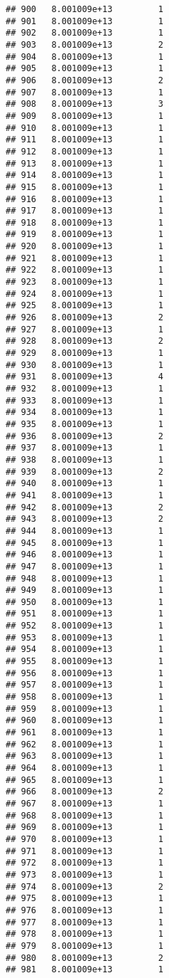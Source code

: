 \documentclass[
]{article}
\begin{document}
\begin{verbatim}
## 900   8.001009e+13         1
## 901   8.001009e+13         1
## 902   8.001009e+13         1
## 903   8.001009e+13         2
## 904   8.001009e+13         1
## 905   8.001009e+13         1
## 906   8.001009e+13         2
## 907   8.001009e+13         1
## 908   8.001009e+13         3
## 909   8.001009e+13         1
## 910   8.001009e+13         1
## 911   8.001009e+13         1
## 912   8.001009e+13         1
## 913   8.001009e+13         1
## 914   8.001009e+13         1
## 915   8.001009e+13         1
## 916   8.001009e+13         1
## 917   8.001009e+13         1
## 918   8.001009e+13         1
## 919   8.001009e+13         1
## 920   8.001009e+13         1
## 921   8.001009e+13         1
## 922   8.001009e+13         1
## 923   8.001009e+13         1
## 924   8.001009e+13         1
## 925   8.001009e+13         1
## 926   8.001009e+13         2
## 927   8.001009e+13         1
## 928   8.001009e+13         2
## 929   8.001009e+13         1
## 930   8.001009e+13         1
## 931   8.001009e+13         4
## 932   8.001009e+13         1
## 933   8.001009e+13         1
## 934   8.001009e+13         1
## 935   8.001009e+13         1
## 936   8.001009e+13         2
## 937   8.001009e+13         1
## 938   8.001009e+13         1
## 939   8.001009e+13         2
## 940   8.001009e+13         1
## 941   8.001009e+13         1
## 942   8.001009e+13         2
## 943   8.001009e+13         2
## 944   8.001009e+13         1
## 945   8.001009e+13         1
## 946   8.001009e+13         1
## 947   8.001009e+13         1
## 948   8.001009e+13         1
## 949   8.001009e+13         1
## 950   8.001009e+13         1
## 951   8.001009e+13         1
## 952   8.001009e+13         1
## 953   8.001009e+13         1
## 954   8.001009e+13         1
## 955   8.001009e+13         1
## 956   8.001009e+13         1
## 957   8.001009e+13         1
## 958   8.001009e+13         1
## 959   8.001009e+13         1
## 960   8.001009e+13         1
## 961   8.001009e+13         1
## 962   8.001009e+13         1
## 963   8.001009e+13         1
## 964   8.001009e+13         1
## 965   8.001009e+13         1
## 966   8.001009e+13         2
## 967   8.001009e+13         1
## 968   8.001009e+13         1
## 969   8.001009e+13         1
## 970   8.001009e+13         1
## 971   8.001009e+13         1
## 972   8.001009e+13         1
## 973   8.001009e+13         1
## 974   8.001009e+13         2
## 975   8.001009e+13         1
## 976   8.001009e+13         1
## 977   8.001009e+13         1
## 978   8.001009e+13         1
## 979   8.001009e+13         1
## 980   8.001009e+13         2
## 981   8.001009e+13         1

\end{verbatim}
\end{document}
